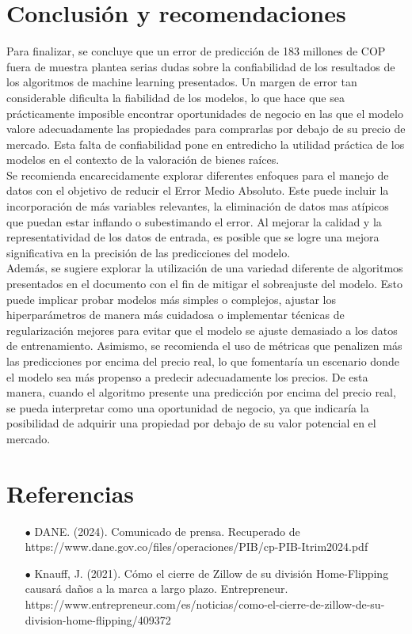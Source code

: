 \documentclass[10pt]{article}
\begin{document}
\section{Conclusión y recomendaciones}

Para finalizar, se concluye que un error de predicción de 183 millones de COP fuera de muestra plantea serias dudas sobre la confiabilidad de los resultados de los algoritmos de machine learning presentados. Un margen de error tan considerable dificulta la fiabilidad de los modelos, lo que hace que sea prácticamente imposible encontrar oportunidades de negocio en las que el modelo valore adecuadamente las propiedades para comprarlas por debajo de su precio de mercado. Esta falta de confiabilidad pone en entredicho la utilidad práctica de los modelos en el contexto de la valoración de bienes raíces. \\

Se recomienda encarecidamente explorar diferentes enfoques para el manejo de datos con el objetivo de reducir el Error Medio Absoluto. Este puede incluir la incorporación de más variables relevantes, la eliminación de datos mas atípicos que puedan estar inflando o subestimando el error. Al mejorar la calidad y la representatividad de los datos de entrada, es posible que se logre una mejora significativa en la precisión de las predicciones del modelo. \\

Además, se sugiere explorar la utilización de una variedad diferente de algoritmos presentados en el documento con el fin de mitigar el sobreajuste del modelo. Esto puede implicar probar modelos más simples o complejos, ajustar los hiperparámetros de manera más cuidadosa o implementar técnicas de regularización mejores para evitar que el modelo se ajuste demasiado a los datos de entrenamiento. Asimismo, se recomienda el uso de métricas que penalizen más las predicciones por encima del precio real, lo que fomentaría un escenario donde el modelo sea más propenso a predecir adecuadamente los precios. De esta manera, cuando el algoritmo presente una predicción por encima del precio real, se pueda interpretar como una oportunidad de negocio, ya que indicaría la posibilidad de adquirir una propiedad por debajo de su valor potencial en el mercado.

\section*{Referencias}

\begin{itemize}
    \item[$\bullet$] DANE. (2024). Comunicado de prensa. Recuperado de https://www.dane.gov.co/files/operaciones/PIB/cp-PIB-Itrim2024.pdf
    \item[$\bullet$]  Knauff, J. (2021). Cómo el cierre de Zillow de su división Home-Flipping causará daños a la marca a largo plazo. Entrepreneur. https://www.entrepreneur.com/es/noticias/como-el-cierre-de-zillow-de-su-division-home-flipping/409372
\end{itemize}
\end{document}
